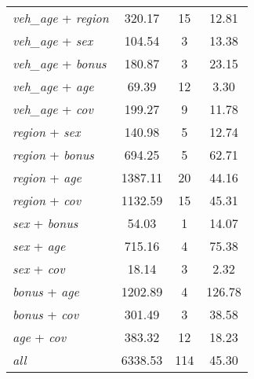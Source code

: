 {\begin{ThreePartTable}
\begin{longtable}{lccc}
    \textit{veh\_age} + \textit{region} &   320.17 &       15 &    12.81 \\
    \textit{veh\_age} + \textit{sex} &   104.54 &        3 &    13.38 \\
    \textit{veh\_age} + \textit{bonus} &   180.87 &        3 &    23.15 \\
    \textit{veh\_age} + \textit{age} &    69.39 &       12 &     3.30 \\
    \textit{veh\_age} + \textit{cov} &   199.27 &        9 &    11.78 \\
    \textit{region} + \textit{sex} &   140.98 &        5 &    12.74 \\
    \textit{region} + \textit{bonus} &   694.25 &        5 &    62.71 \\
    \textit{region} + \textit{age} &  1387.11 &       20 &    44.16 \\
    \textit{region} + \textit{cov} &  1132.59 &       15 &    45.31 \\
    \textit{sex} + \textit{bonus} &    54.03 &        1 &    14.07 \\
    \textit{sex} + \textit{age} &   715.16 &        4 &    75.38 \\
    \textit{sex} + \textit{cov} &    18.14 &        3 &     2.32 \\
    \textit{bonus} + \textit{age} &  1202.89 &        4 &   126.78 \\
    \textit{bonus} + \textit{cov} &   301.49 &        3 &    38.58 \\
    \textit{age} + \textit{cov} &   383.32 &       12 &    18.23 \\
    \textit{all}\tnote{\ddag} &  6338.53 &      114 &    45.30 \\

\end{longtable}
\end{ThreePartTable}
}
